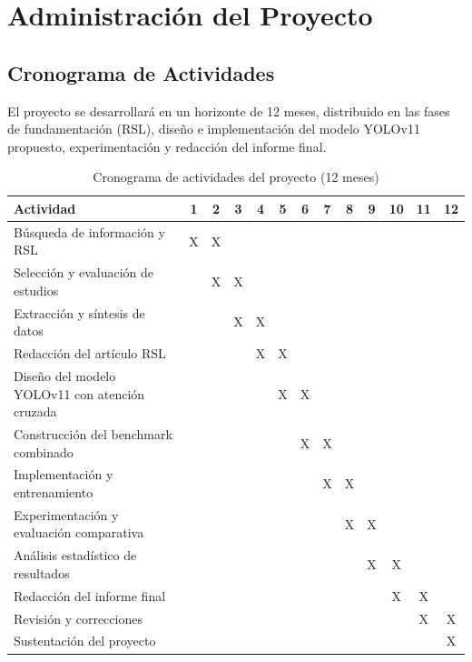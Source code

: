 \section{Administraci\'on del Proyecto}

\subsection{Cronograma de Actividades}

El proyecto se desarrollar\'a en un horizonte de 12 meses, distribuido
en las fases de fundamentaci\'on (RSL), dise\~no e implementaci\'on del
modelo YOLOv11 propuesto, experimentaci\'on y redacci\'on del informe
final.

\renewcommand{\arraystretch}{1.3}
\begin{table}[h!]
\centering
\caption{Cronograma de actividades del proyecto (12 meses)}
\label{tab:cronograma}
\setlength{\tabcolsep}{3pt}
\begin{tabular}{|l|c|c|c|c|c|c|c|c|c|c|c|c|}
\hline
\textbf{Actividad} &
\textbf{1} & \textbf{2} & \textbf{3} & \textbf{4} &
\textbf{5} & \textbf{6} & \textbf{7} & \textbf{8} &
\textbf{9} & \textbf{10} & \textbf{11} & \textbf{12} \\
\hline
B\'usqueda de informaci\'on y RSL &
X & X & & & & & & & & & & \\
\hline
Selecci\'on y evaluaci\'on de estudios &
& X & X & & & & & & & & & \\
\hline
Extracci\'on y s\'intesis de datos &
& & X & X & & & & & & & & \\
\hline
Redacci\'on del art\'iculo RSL &
& & & X & X & & & & & & & \\
\hline
Dise\~no del modelo YOLOv11 con atenci\'on cruzada &
& & & & X & X & & & & & & \\
\hline
Construcci\'on del benchmark combinado &
& & & & & X & X & & & & & \\
\hline
Implementaci\'on y entrenamiento &
& & & & & & X & X & & & & \\
\hline
Experimentaci\'on y evaluaci\'on comparativa &
& & & & & & & X & X & & & \\
\hline
An\'alisis estad\'istico de resultados &
& & & & & & & & X & X & & \\
\hline
Redacci\'on del informe final &
& & & & & & & & & X & X & \\
\hline
Revisi\'on y correcciones &
& & & & & & & & & & X & X \\
\hline
Sustentaci\'on del proyecto &
& & & & & & & & & & & X \\
\hline
\end{tabular}
\end{table}

